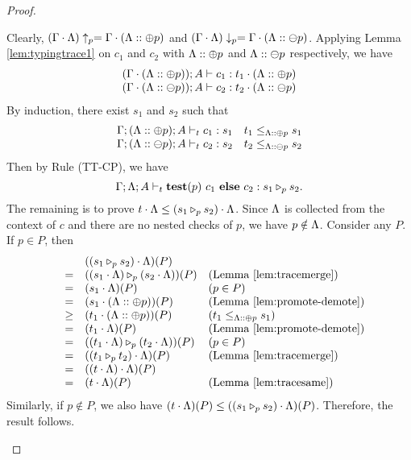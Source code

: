 {{{\begin{proof}
\begin{ProofEnumDesc}
Clearly,
$(\Gamma\cdot \trace)\uparrow_{p}= \Gamma\cdot (\trace::\tplus{p})$
and $(\Gamma\cdot \trace)\downarrow_{p}= \Gamma\cdot (\trace::\tminus{p})$.
Applying Lemma \ref{lem:typingtrace1} on $c_1$ and $c_2$ with $\trace::\tplus  {p}$ and $ \trace::\tminus{p}$ respectively, we have
\begin{equation*}
\begin{array}{l}
(\Gamma\cdot(\trace::\tplus  {p})); A \vdash c_1 : t_1\cdot(\trace::\tplus  {p})\\
(\Gamma\cdot (\trace::\tminus {p})); A \vdash c_2 : t_2\cdot(\trace::\tminus  {p})
\end{array}
\end{equation*}
By induction, there exist $s_1$ and $s_2$ such that
\begin{equation*}
\begin{array}{l}
\Gamma; (\trace :: \tplus {p});  A \vdash_{t} c_1 : s_1\quad
t_1 \leq_{\trace::\tplus p} s_1 \\
\Gamma; (\trace:: \tminus {p});  A \vdash_{t} c_2 : s_2\quad
t_2 \leq_{\trace::\tminus p} s_2
\end{array}
\end{equation*}
Then by Rule {(TT-CP)}, we have
$$
\Gamma;\trace;A\vdash_{t} \lcCP{p}{c_1}{c_2} : \omerge{p}{s_1}{s_2}.
$$
The remaining is to prove $t\cdot\trace \leq (\omerge{p}{s_1}{s_2})\cdot\trace$.
Since $\trace$ is collected from the context of $c$ and there are no nested checks of $p$, we have $p \notin \trace$.
Consider any $P$. If $p \in P$, then
$$
\begin{array}{rlll}
&&((\omerge{p}{s_1}{s_2})\cdot\trace)(P) &\\
&=&(\omerge{p}{(s_1\cdot\trace)}{(s_2\cdot\trace)})(P) &(\textrm{Lemma \ref{lem:tracemerge}})\\
&=&(s_1\cdot\trace)(P) & (p\in P)\\
&=&(s_1\cdot(\trace::\tplus{p}))(P) & (\textrm{Lemma \ref{lem:promote-demote}})\\
&\geq&(t_1\cdot(\trace::\tplus{p}))(P) & (t_1 \leq_{\trace::\tplus{p}} s_1)\\
& = & (t_1\cdot\trace)(P) &(\textrm{Lemma \ref{lem:promote-demote}})\\
& = & (\omerge{p}{(t_1\cdot\trace)}{(t_2\cdot\trace)})(P)&(p\in P)\\
& = & ((\omerge{p}{t_1}{t_2})\cdot\trace)(P)& (\textrm{Lemma \ref{lem:tracemerge}})\\
& = & ((t\cdot\trace)\cdot\trace)(P)&\\
& = & (t\cdot\trace)(P)& (\textrm{Lemma \ref{lem:tracesame}})\\
\end{array}
$$
Similarly, if $p\notin P$, we also have $(t \cdot \trace)(P)\leq ((\omerge{p}{s_1}{s_2})\cdot\trace)(P)$.
Therefore, the result follows.


\end{ProofEnumDesc}
\end{proof}}}}
